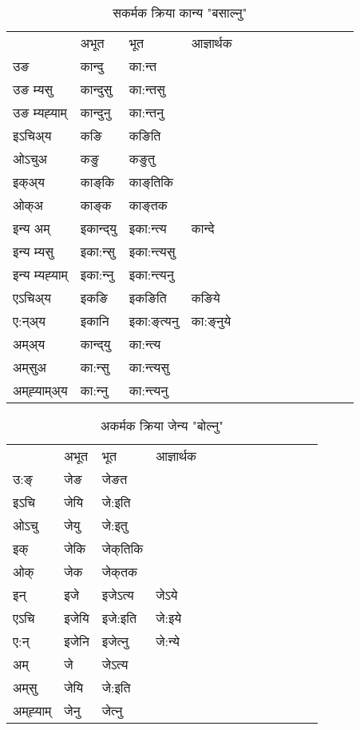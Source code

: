 \begin{table}[H]
\centering
\caption{\label{aŋt.vt} सकर्मक क्रिया  कान्य  "बसाल्नु"  }
\begin{tabular}{l|l|l|l|l|l|l|l|l|l|l|l|l}  \toprule
&अभूत & भूत & आज्ञार्थक \\ 
उङ &कान्दु &का:न्त \\ 
उङ म्यसु &कान्दुसु &का:न्तसु \\ 
उङ म्यह्‍याम् &कान्दुनु &का:न्तनु \\ 
इऽचिअ्य &कङि &कङिति   \\ 
ओऽचुअ &कङु &कङुतु   \\ 
इक्अ्य &काङ्‌कि &काङ्‌तिकि   \\ 
ओक्अ &काङ्‌क &काङ्‌तक   \\ 
इन्य अम् & इकान्द्‌यु  & इका:न्त्य &कान्दे  \\ 
इन्य म्यसु & इका:न्सु  & इका:न्त्यसु   \\ 
इन्य म्यह्‍याम् & इका:न्‍नु  & इका:न्त्यनु   \\ 
एऽचिअ्य & इकङि & इकङिति &कङिये    \\ 
ए:न्अ्य & इकानि  & इका:ङ्‌त्यनु &का:ङ्‌नुये  \\ 
अम्अ्य & कान्द्‌यु  & का:न्त्य  \\ 
अम्‌सुअ & का:न्सु & का:न्त्यसु  \\ 
अम्‌ह्‍याम्अ्य & का:न्‍नु  & का:न्त्यनु \\ 
\bottomrule
\end{tabular}
\end{table}


\begin{table}[H]
\centering
\caption{\label{e.vi} अकर्मक क्रिया  जेन्य  "बोल्नु"  }
\begin{tabular}{l|l|l|l|l|l|l|l|l|l|l|l|l}  \toprule
&अभूत & भूत & आज्ञार्थक \\ 
उ:ङ्‌ &जेङ &जेङत \\ 
इऽचि &जेयि &जे:इति   \\ 
ओऽचु &जेयु &जे:इतु   \\ 
इक् &जेकि &जेक्‌तिकि   \\ 
ओक् &जेक &जेक्‌तक   \\ 
इन् & इजे & इजेऽत्य &जेऽये  \\ 
एऽचि & इजेयि & इजे:इति &जे:इये    \\ 
ए:न् & इजेनि  & इजेत्‍नु &जे:न्ये  \\ 
अम् & जे & जेऽत्य   \\ 
अम्‌सु & जेयि & जे:इति     \\ 
अम्‌ह्‍याम् & जेनु  & जेत्‍नु \\ 
\bottomrule
\end{tabular}
\end{table}


